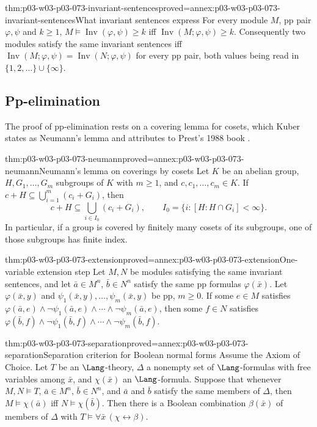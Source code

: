 \begin{hblemma}{thm:p03-w03-p03-073-invariant-sentences}{proved=annex:p03-w03-p03-073-invariant-sentences}{What invariant sentences express}
For every module \(M\), pp pair \(\varphi,\psi\) and \(k\ge1\),
\(M\models\operatorname{Inv}(\varphi,\psi)\ge k\) iff
\(\operatorname{Inv}(M;\varphi,\psi)\ge k\). Consequently two modules
satisfy the same invariant sentences iff
\(\operatorname{Inv}(M;\varphi,\psi)=\operatorname{Inv}(N;\varphi,\psi)\)
for every pp pair, both values being read in
\(\{1,2,\ldots\}\cup\{\infty\}\).
\end{hblemma}

\subsection{Pp-elimination}
\label{sec:p03-w03-p03-073-pp-elimination}

The proof of pp-elimination rests on a covering lemma for cosets, which
Kuber states as Neumann's lemma and attributes to Prest's 1988 book
\cite[Lemma~2.5.8]{Kuber2013GrothendieckModules}.

\begin{hblemma}{thm:p03-w03-p03-073-neumann}{proved=annex:p03-w03-p03-073-neumann}{Neumann's lemma on coverings by cosets}
Let \(K\) be an abelian group, \(H,G_1,\ldots,G_m\) subgroups of \(K\)
with \(m\ge1\), and \(c,c_1,\ldots,c_m\in K\). If
\(c+H\subseteq\bigcup_{i=1}^m(c_i+G_i)\), then
\[
 c+H\subseteq\bigcup_{i\in I_0}(c_i+G_i),\qquad
 I_0=\{i:[H:H\cap G_i]<\infty\}.
\]
In particular, if a group is covered by finitely many cosets of its
subgroups, one of those subgroups has finite index.
\end{hblemma}

\begin{hblemma}{thm:p03-w03-p03-073-extension}{proved=annex:p03-w03-p03-073-extension}{One-variable extension step}
Let \(M,N\) be modules satisfying the same invariant sentences, and let
\(\bar a\in M^n\), \(\bar b\in N^n\) satisfy the same pp formulas
\(\varphi(\bar x)\). Let \(\varphi(\bar x,y)\) and
\(\psi_1(\bar x,y),\ldots,\psi_m(\bar x,y)\) be pp, \(m\ge0\). If some
\(e\in M\) satisfies
\(\varphi(\bar a,e)\wedge\neg\psi_1(\bar a,e)\wedge\cdots\wedge\neg\psi_m(\bar a,e)\),
then some \(f\in N\) satisfies
\(\varphi(\bar b,f)\wedge\neg\psi_1(\bar b,f)\wedge\cdots\wedge\neg\psi_m(\bar b,f)\).
\end{hblemma}

\begin{hblemma}{thm:p03-w03-p03-073-separation}{proved=annex:p03-w03-p03-073-separation}{Separation criterion for Boolean normal forms}
Assume the Axiom of Choice. Let \(T\) be an \(\Lang\)-theory, \(\Delta\) a
nonempty set of \(\Lang\)-formulas with free variables among
\(\bar x\), and \(\chi(\bar x)\) an \(\Lang\)-formula. Suppose that whenever
\(M,N\models T\), \(\bar a\in M^n\), \(\bar b\in N^n\), and \(\bar a\)
and \(\bar b\) satisfy the same members of \(\Delta\), then
\(M\models\chi(\bar a)\) iff \(N\models\chi(\bar b)\). Then there is a
Boolean combination \(\beta(\bar x)\) of members of \(\Delta\) with
\(T\models\forall\bar x\,(\chi\leftrightarrow\beta)\).
\end{hblemma}

